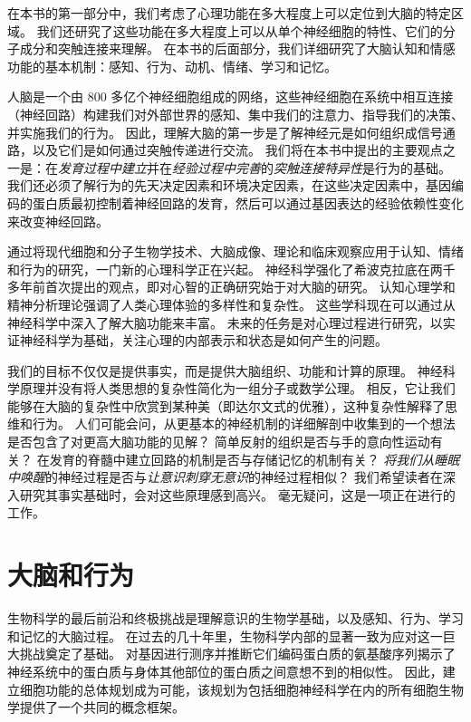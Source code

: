 在本书的第一部分中，我们考虑了心理功能在多大程度上可以定位到大脑的特定区域。
我们还研究了这些功能在多大程度上可以从单个神经细胞的特性、它们的分子成分和突触连接来理解。
在本书的后面部分，我们详细研究了大脑认知和情感功能的基本机制：感知、行为、动机、情绪、学习和记忆。


人脑是一个由 800 多亿个神经细胞组成的网络，这些神经细胞在系统中相互连接（神经回路）构建我们对外部世界的感知、集中我们的注意力、指导我们的决策、并实施我们的行为。
因此，理解大脑的第一步是了解神经元是如何组织成信号通路，以及它们是如何通过突触传递进行交流。
我们将在本书中提出的主要观点之一是：在\textit{发育过程中建立}并在\textit{经验过程中完善}的\textit{突触连接特异性}是行为的基础。
我们还必须了解行为的先天决定因素和环境决定因素，在这些决定因素中，基因编码的蛋白质最初控制着神经回路的发育，然后可以通过基因表达的经验依赖性变化来改变神经回路。


通过将现代细胞和分子生物学技术、大脑成像、理论和临床观察应用于认知、情绪和行为的研究，一门新的心理科学正在兴起。
神经科学强化了希波克拉底在两千多年前首次提出的观点，即对心智的正确研究始于对大脑的研究。
认知心理学和精神分析理论强调了人类心理体验的多样性和复杂性。
这些学科现在可以通过从神经科学中深入了解大脑功能来丰富。
未来的任务是对心理过程进行研究，以实证神经科学为基础，关注心理的内部表示和状态是如何产生的问题。


我们的目标不仅仅是提供事实，而是提供大脑组织、功能和计算的原理。
神经科学原理并没有将人类思想的复杂性简化为一组分子或数学公理。
相反，它让我们能够在大脑的复杂性中欣赏到某种美（即达尔文式的优雅），这种复杂性解释了思维和行为。
人们可能会问，从更基本的神经机制的详细解剖中收集到的一个想法是否包含了对更高大脑功能的见解？
简单反射的组织是否与手的意向性运动有关？
在发育的脊髓中建立回路的机制是否与存储记忆的机制有关？
\textit{将我们从睡眠中唤醒}的神经过程是否与\textit{让意识刺穿无意识}的神经过程相似？
我们希望读者在深入研究其事实基础时，会对这些原理感到高兴。
毫无疑问，这是一项正在进行的工作。





\chapter{大脑和行为} \label{chap:chap1}
生物科学的最后前沿和终极挑战是理解意识的生物学基础，以及感知、行为、学习和记忆的大脑过程。
在过去的几十年里，生物科学内部的显著一致为应对这一巨大挑战奠定了基础。
对基因进行测序并推断它们编码蛋白质的氨基酸序列揭示了神经系统中的蛋白质与身体其他部位的蛋白质之间意想不到的相似性。 
因此，建立细胞功能的总体规划成为可能，该规划为包括细胞神经科学在内的所有细胞生物学提供了一个共同的概念框架。


